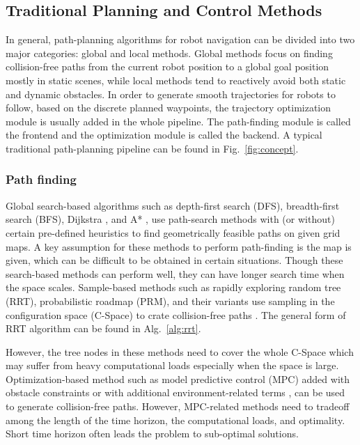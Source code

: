 \documentclass[letterpaper,journal,twoside]{IEEEtran}
\begin{document}
\subsection{Traditional Planning and Control Methods}



In general, path-planning algorithms for robot navigation can be divided into two major categories: global and local methods.  
Global methods focus on finding collision-free paths from the current robot position to a global goal position mostly in static scenes, while local methods tend to reactively avoid both static and dynamic obstacles. 
In order to generate smooth trajectories for robots to follow, based on the discrete planned waypoints, the trajectory optimization module is usually added in the whole pipeline. 
The path-finding module is called the frontend and the optimization module is called the backend. 
A typical traditional path-planning pipeline can be found in Fig.~\ref{fig:concept}.

\subsubsection{Path finding}

% 
Global search-based algorithms such as depth-first search (DFS), breadth-first search (BFS), Dijkstra \cite{wang2011application}, and A* \cite{hart1968formal}, use path-search methods with (or without) certain pre-defined heuristics to find geometrically feasible paths on given grid maps. 
A key assumption for these methods to perform path-finding is the map is given, which can be difficult to be obtained in certain situations. 
Though these search-based methods can perform well, they can have longer search time when the space scales.
Sample-based methods such as rapidly exploring random tree (RRT), probabilistic roadmap (PRM), and their variants use sampling in the configuration space (C-Space) to crate collision-free paths \cite{lavalle2001rapidly,karaman2011sampling,kavraki1996probabilistic}. 
The general form of RRT algorithm can be found in Alg.~\ref{alg:rrt}.

However, the tree nodes in these methods need to cover the whole C-Space which may suffer from heavy computational loads especially when the space is large.  
Optimization-based method such as model predictive control (MPC) added with obstacle constraints or with additional environment-related terms \cite{park2009obstacle}, \cite{ji2016path}  can be used to generate collision-free paths. 
However, MPC-related methods need to tradeoff among the length of the time horizon, the computational loads, and optimality. Short time horizon often leads the problem to sub-optimal solutions.
\end{document}
